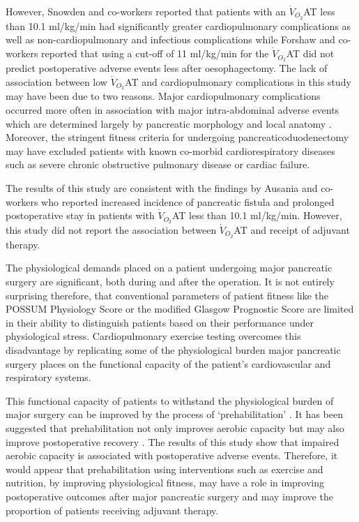 However, Snowden and co-workers \parencite{snowden_submaximal_2010} reported that patients with an $\dot{V}_{O_2}$AT less than 10.1 ml/kg/min had significantly greater cardiopulmonary complications as well as non-cardiopulmonary and infectious complications while Forshaw and co-workers \parencite{forshaw_is_2008} reported that using a cut-off of 11 ml/kg/min for the $\dot{V}_{O_2}$AT did not predict postoperative adverse events less after oesophagectomy. 
The lack of association between low $\dot{V}_{O_2}$AT and cardiopulmonary complications in this study may have been due to two reasons. 
Major cardiopulmonary complications occurred more often in association with major intra-abdominal adverse events which are determined largely by pancreatic morphology and local anatomy \parencite{braga_prognostic_2011}. 
Moreover, the stringent fitness criteria for undergoing pancreaticoduodenectomy may have excluded patients with known co-morbid cardiorespiratory diseases such as severe chronic obstructive pulmonary disease or cardiac failure.

The results of this study are consistent with the findings by Ausania and co-workers \parencite{ausania_effects_2012} who reported increased incidence of pancreatic fistula and prolonged postoperative stay in patients with $\dot{V}_{O_2}$AT less than 10.1 ml/kg/min. 
However, this study did not report the association between $\dot{V}_{O_2}$AT and receipt of adjuvant therapy.

The physiological demands placed on a patient undergoing major pancreatic surgery are significant, both during and after the operation. 
It is not entirely surprising therefore, that conventional parameters of patient fitness like the POSSUM Physiology Score or the modified Glasgow Prognostic Score are limited in their ability to distinguish patients based on their performance under physiological stress. 
Cardiopulmonary exercise testing overcomes this disadvantage by replicating some of the physiological burden major pancreatic surgery places on the functional capacity of the patient's cardiovascular and respiratory systems.

This functional capacity of patients to withstand the physiological burden of major surgery can be improved by the process of `prehabilitation' \parencite{topp_effect_2002}. 
It has been suggested that prehabilitation not only improves aerobic capacity \parencite{jones_effects_2007} but may also improve postoperative recovery \parencite{mayo_impact_2011, pehlivan_effects_2011}. 
The results of this study show that impaired aerobic capacity is associated with postoperative adverse events. 
Therefore, it would appear that prehabilitation using interventions such as exercise and nutrition, by improving physiological fitness, may have a role in improving postoperative outcomes after major pancreatic surgery and may improve the proportion of patients receiving adjuvant therapy.

